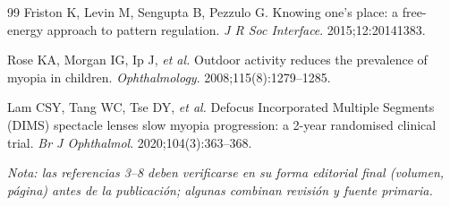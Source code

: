 \documentclass[11pt,a4paper]{article}
\begin{document}
\begin{thebibliography}{99}
 Friston K, Levin M, Sengupta B, Pezzulo G. Knowing one's place: a free-energy approach to pattern regulation. \emph{J R Soc Interface}. 2015;12:20141383.

 Rose KA, Morgan IG, Ip J, \emph{et al.} Outdoor activity reduces the prevalence of myopia in children. \emph{Ophthalmology}. 2008;115(8):1279--1285.

 Lam CSY, Tang WC, Tse DY, \emph{et al.} Defocus Incorporated Multiple Segments (DIMS) spectacle lenses slow myopia progression: a 2-year randomised clinical trial. \emph{Br J Ophthalmol}. 2020;104(3):363--368.

\end{thebibliography}

\vspace{1em}
\noindent\footnotesize\emph{Nota: las referencias 3--8 deben verificarse en su forma editorial final (volumen, página) antes de la publicación; algunas combinan revisión y fuente primaria.}
\end{document}
